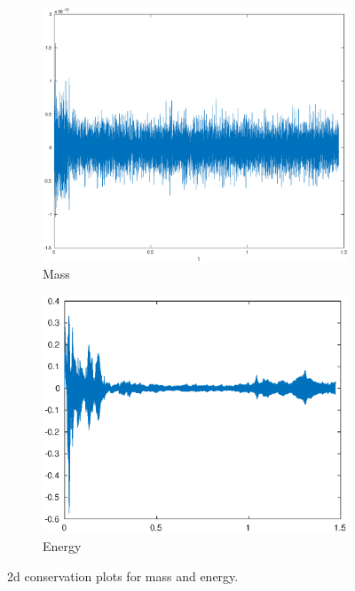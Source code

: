 \begin{figure}[h!]
    \centering
    \begin{subfigure}[b]{0.46\textwidth}
        \centering
        \includegraphics[width=\textwidth]{images/cons_mass.eps}\hfill
        \caption{Mass}
        \label{fig:Energy}
    \end{subfigure}
    \hfill
    \begin{subfigure}[b]{0.45\textwidth}
        \centering
        \includegraphics[width=\textwidth]{images/cons_energy.eps}\hfill
        \caption{Energy}
        \label{fig:Mass}
    \end{subfigure}
    \caption{2d conservation plots for mass and energy.}
    \label{fig:three graphs}
\end{figure}

